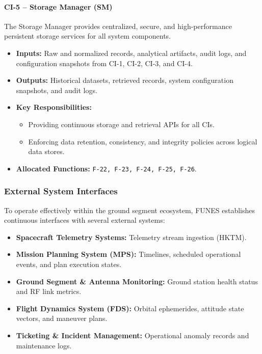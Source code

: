 \paragraph{CI-5 -- Storage Manager (SM)}
The Storage Manager provides centralized, secure, and high-performance persistent storage services for all system components.
\begin{itemize}
    \item \textbf{Inputs:} Raw and normalized records, analytical artifacts, audit logs, and configuration snapshots from CI-1, CI-2, CI-3, and CI-4.
    \item \textbf{Outputs:} Historical datasets, retrieved records, system configuration snapshots, and audit logs.
    \item \textbf{Key Responsibilities:}
    \begin{itemize}
        \item Providing continuous storage and retrieval APIs for all CIs.
        \item Enforcing data retention, consistency, and integrity policies across logical data stores.
    \end{itemize}
    \item \textbf{Allocated Functions:} \texttt{F-22, F-23, F-24, F-25, F-26}.
\end{itemize}

\subsubsection{External System Interfaces}
To operate effectively within the ground segment ecosystem, FUNES establishes continuous interfaces with several external systems:
\begin{itemize}
    \item \textbf{Spacecraft Telemetry Systems:} Telemetry stream ingestion (HKTM).
    \item \textbf{Mission Planning System (MPS):} Timelines, scheduled operational events, and plan execution states.
    \item \textbf{Ground Segment \& Antenna Monitoring:} Ground station health status and RF link metrics.
    \item \textbf{Flight Dynamics System (FDS):} Orbital ephemerides, attitude state vectors, and maneuver plans.
    \item \textbf{Ticketing \& Incident Management:} Operational anomaly records and maintenance logs.
\end{itemize}

